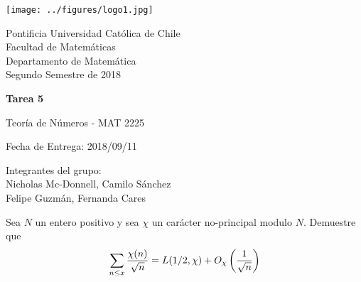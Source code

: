 


\begin{minipage}{2.5cm}
	\texttt{[image: ../figures/logo1.jpg]}
\end{minipage}
\begin{minipage}{13cm}
	\begin{flushleft}
		\raggedright
		{
			\noindent
			{\sc Pontificia Universidad Católica de Chile\\
				Facultad de Matemáticas\\
				Departamento de Matemática} \smallskip \\
			Segundo Semestre de 2018\\
		}
	\end{flushleft}
\end{minipage}

\vspace{2ex}
{\Large \centerline{\bf Tarea 5}}
{\large \centerline{Teoría de Números - MAT 2225}}
\centerline{Fecha de Entrega: 2018/09/11}

\begin{flushright}
	Integrantes del grupo:\\
	Nicholas Mc-Donnell, Camilo Sánchez\\
	Felipe Guzmán, Fernanda Cares
\end{flushright}

\begin{prob}[6 pts.]
	Sea $N$ un entero positivo y sea $\chi$ un carácter no-principal modulo $N$. Demuestre que
	\[\sum_{n\leq x}\frac{\chi(n)}{\sqrt{n}}=L(1/2,\chi)+\BigO[\chi]{\frac1{\sqrt{n}}}\]
\end{prob}

